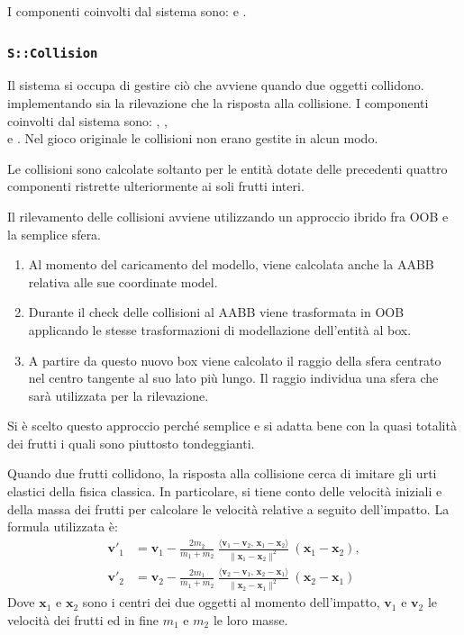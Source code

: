I componenti coinvolti dal sistema sono:  e .



\subsubsection{\texttt{S::Collision}}
Il sistema  si occupa di gestire ciò che avviene quando due oggetti collidono. implementando sia la rilevazione che la risposta alla collisione. I componenti coinvolti dal sistema sono: , ,\\  e . Nel gioco originale le collisioni non erano gestite in alcun modo.

Le collisioni sono calcolate soltanto per le entità dotate delle precedenti quattro componenti ristrette ulteriormente ai soli frutti interi. 

Il rilevamento delle collisioni avviene utilizzando un approccio ibrido fra OOB e la semplice sfera.
\begin{enumerate}
\item Al momento del caricamento del modello, viene calcolata anche la AABB relativa alle sue coordinate model.
\item Durante il check delle collisioni al AABB viene trasformata in OOB applicando le stesse trasformazioni di modellazione dell'entità al box.
\item A partire da questo nuovo box viene calcolato il raggio della sfera centrato nel centro tangente al suo lato più lungo. Il raggio individua una sfera che sarà utilizzata per la rilevazione.
\end{enumerate}
Si è scelto questo approccio perché semplice e si adatta bene con la quasi totalità dei frutti i quali sono piuttosto tondeggianti.

Quando due frutti collidono, la risposta alla collisione cerca di imitare gli urti elastici della fisica classica. In particolare, si tiene conto delle velocità iniziali e della massa dei frutti per calcolare le velocità relative a seguito dell'impatto. La formula utilizzata è:
\begin{equation}
{\begin{aligned}\mathbf {v} '_{1}&=\mathbf {v} _{1}-{\frac {2m_{2}}{m_{1}+m_{2}}}\ {\frac {\langle \mathbf {v} _{1}-\mathbf {v} _{2},\,\mathbf {x} _{1}-\mathbf {x} _{2}\rangle }{\|\mathbf {x} _{1}-\mathbf {x} _{2}\|^{2}}}\ (\mathbf {x} _{1}-\mathbf {x} _{2}),\\\mathbf {v} '_{2}&=\mathbf {v} _{2}-{\frac {2m_{1}}{m_{1}+m_{2}}}\ {\frac {\langle \mathbf {v} _{2}-\mathbf {v} _{1},\,\mathbf {x} _{2}-\mathbf {x} _{1}\rangle }{\|\mathbf {x} _{2}-\mathbf {x} _{1}\|^{2}}}\ (\mathbf {x} _{2}-\mathbf {x} _{1})\end{aligned}}
\end{equation}
Dove $\mathbf{x}_1$ e $\mathbf{x}_2$ sono i centri dei due oggetti al momento dell'impatto, $\mathbf{v}_1$ e $\mathbf{v}_2$ le velocità dei frutti ed in fine $m_1$ e $m_2$ le loro masse.


